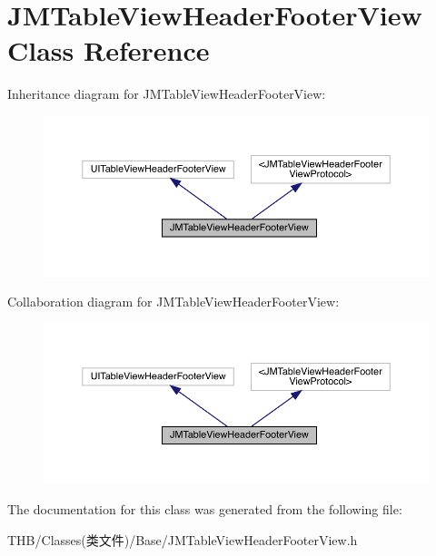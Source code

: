 \hypertarget{interface_j_m_table_view_header_footer_view}{}\section{J\+M\+Table\+View\+Header\+Footer\+View Class Reference}
\label{interface_j_m_table_view_header_footer_view}


Inheritance diagram for J\+M\+Table\+View\+Header\+Footer\+View\+:\nopagebreak
\begin{figure}[H]
\begin{center}
\leavevmode
\includegraphics[width=350pt]{interface_j_m_table_view_header_footer_view__inherit__graph}
\end{center}
\end{figure}


Collaboration diagram for J\+M\+Table\+View\+Header\+Footer\+View\+:\nopagebreak
\begin{figure}[H]
\begin{center}
\leavevmode
\includegraphics[width=350pt]{interface_j_m_table_view_header_footer_view__coll__graph}
\end{center}
\end{figure}


The documentation for this class was generated from the following file\+:\begin{DoxyCompactItemize}
\item 
T\+H\+B/\+Classes(类文件)/\+Base/J\+M\+Table\+View\+Header\+Footer\+View.\+h\end{DoxyCompactItemize}
